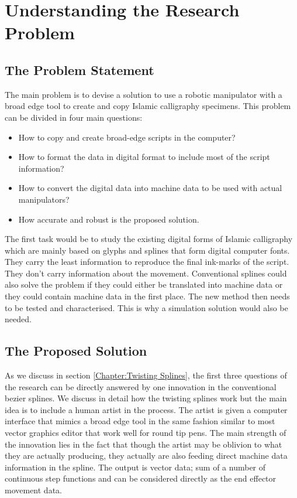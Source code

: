 \section{Understanding the Research Problem}\label{Chapter:Problem Statement}
{ 
    \subsection{The Problem Statement}
    {
        The main problem is to devise a solution to use a robotic manipulator with a broad edge tool to create and copy Islamic calligraphy specimens. This problem can be divided in four main questions:
        \begin{itemize}
          \item How to copy and create broad-edge scripts in the computer?
          \item How to format the data in digital format to include most of the script information?
          \item How to convert the digital data into machine data to be used with actual manipulators?
          \item How accurate and robust is the proposed solution.
        \end{itemize}
        
        The first task would be to study the existing digital forms of Islamic calligraphy which are mainly based on glyphs and splines that form digital computer fonts. They carry the least information to reproduce the final ink-marks of the script. They don’t carry information about the movement. Conventional splines could also solve the problem if they could either be translated into machine data or they could contain machine data in the first place. The new method then needs to be tested and characterised. This is why a simulation solution would also be needed.
        
    }
    \subsection{The Proposed Solution}
    {
        As we discuss in section \ref{Chapter:Twisting Splines}, the first three questions of the research can be directly answered by one innovation in the conventional bezier splines. We discuss in detail how the twisting splines work but the main idea is to include a human artist in the process. The artist is given a computer interface that mimics a broad edge tool in the same fashion similar to most vector graphics editor that work well for round tip pens. The main strength of the innovation lies in the fact that though the artist may be oblivion to what they are actually producing, they actually are also feeding direct machine data information in the spline. The output is vector data; sum of a number of continuous step functions and can be considered directly as the end effector movement data.
        
}}
